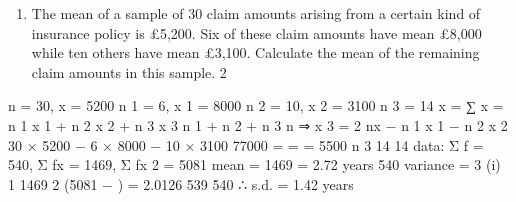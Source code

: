 \documentclass[a4paper,12pt]{article}
\begin{document}
\begin{enumerate} 
\item The mean of a sample of 30 claim amounts arising from a certain kind of insurance
policy is £5,200. Six of these claim amounts have mean £8,000 while ten others have mean £3,100.
Calculate the mean of the remaining claim amounts in this sample.
2

\end{enumerate}

n = 30, x = 5200
n 1 = 6, x 1 = 8000
n 2 = 10, x 2 = 3100
n 3 = 14
x =
∑ x = n 1 x 1 + n 2 x 2 + n 3 x 3
n 1 + n 2 + n 3
n
⇒ x 3 =
2
nx − n 1 x 1 − n 2 x 2 30 × 5200 − 6 × 8000 − 10 × 3100 77000
=
=
= 5500
n 3
14
14
data: Σ f = 540, Σ fx = 1469, Σ fx 2 = 5081
mean =
1469
= 2.72 years
540
variance =
3
(i)
1
1469 2
(5081 −
) = 2.0126
539
540
∴ s.d. = 1.42 years
\end{document}
